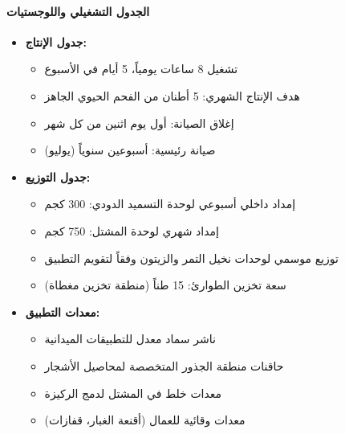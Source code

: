 \paragraph{الجدول التشغيلي واللوجستيات}
\begin{itemize}
    \item \textbf{جدول الإنتاج:} 
    \begin{itemize}
        \item تشغيل 8 ساعات يومياً، 5 أيام في الأسبوع
        \item هدف الإنتاج الشهري: 5 أطنان من الفحم الحيوي الجاهز
        \item إغلاق الصيانة: أول يوم اثنين من كل شهر
        \item صيانة رئيسية: أسبوعين سنوياً (يوليو)
    \end{itemize}
    
    \item \textbf{جدول التوزيع:}
    \begin{itemize}
        \item إمداد داخلي أسبوعي لوحدة التسميد الدودي: 300 كجم
        \item إمداد شهري لوحدة المشتل: 750 كجم
        \item توزيع موسمي لوحدات نخيل التمر والزيتون وفقاً لتقويم التطبيق
        \item سعة تخزين الطوارئ: 15 طناً (منطقة تخزين مغطاة)
    \end{itemize}
    
    \item \textbf{معدات التطبيق:}
    \begin{itemize}
        \item ناشر سماد معدل للتطبيقات الميدانية
        \item حاقنات منطقة الجذور المتخصصة لمحاصيل الأشجار
        \item معدات خلط في المشتل لدمج الركيزة
        \item معدات وقائية للعمال (أقنعة الغبار، قفازات)
    \end{itemize}
\end{itemize}

